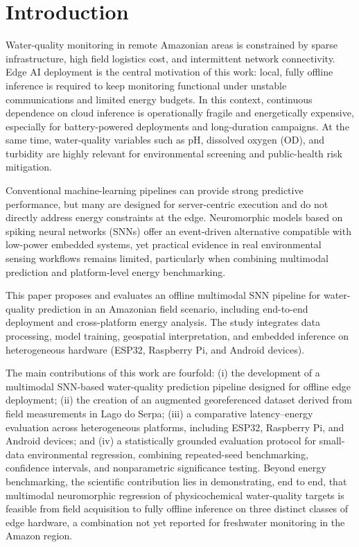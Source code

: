 \section{Introduction}

Water-quality monitoring in remote Amazonian areas is constrained by sparse infrastructure, high field logistics cost, and intermittent network connectivity. Edge AI deployment is the central motivation of this work: local, fully offline inference is required to keep monitoring functional under unstable communications and limited energy budgets. In this context, continuous dependence on cloud inference is operationally fragile and energetically expensive, especially for battery-powered deployments and long-duration campaigns. At the same time, water-quality variables such as pH, dissolved oxygen (OD), and turbidity are highly relevant for environmental screening and public-health risk mitigation.

{\sloppy Conventional machine-learning pipelines can provide strong predictive performance, but many are designed for server-centric execution and do not directly address energy constraints at the edge. Neuromorphic models based on spiking neural networks (SNNs) offer an event-driven alternative compatible with low-power embedded systems, yet practical evidence in real environmental sensing workflows remains limited, particularly when combining multimodal prediction and platform-level energy benchmarking.\par}

This paper proposes and evaluates an offline multimodal SNN pipeline for water-quality prediction in an Amazonian field scenario, including end-to-end deployment and cross-platform energy analysis. The study integrates data processing, model training, geospatial interpretation, and embedded inference on heterogeneous hardware (ESP32, Raspberry Pi, and Android devices).

The main contributions of this work are fourfold: (i) the development of a multimodal SNN-based water-quality prediction pipeline designed for offline edge deployment; (ii) the creation of an augmented georeferenced dataset derived from field measurements in Lago do Serpa; (iii) a comparative latency--energy evaluation across heterogeneous platforms, including ESP32, Raspberry Pi, and Android devices; and (iv) a statistically grounded evaluation protocol for small-data environmental regression, combining repeated-seed benchmarking, confidence intervals, and nonparametric significance testing. Beyond energy benchmarking, the scientific contribution lies in demonstrating, end to end, that multimodal neuromorphic regression of physicochemical water-quality targets is feasible from field acquisition to fully offline inference on three distinct classes of edge hardware, a combination not yet reported for freshwater monitoring in the Amazon region.
